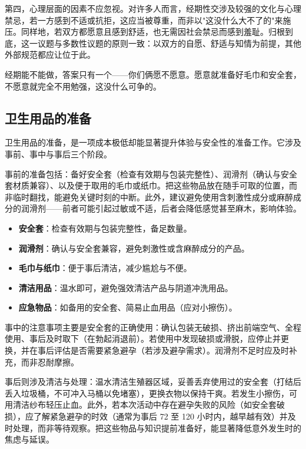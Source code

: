 \documentclass[12pt,UTF8]{ctexbook}
\newcommand{\keyword}[1]{\textbf{#1}}
\begin{document}
第四，心理层面的因素不应忽视。对许多人而言，经期性交涉及较强的文化与心理禁忌，若一方感到不适或抗拒，这应当被尊重，而非以"这没什么大不了的"来施压。同样地，若双方都愿意且感到舒适，也无需因社会禁忌而感到羞耻。归根到底，这一议题与多数性议题的原则一致：以双方的自愿、舒适与知情为前提，其他外部规范都应让位于此。

\begin{tcolorbox}[colback=pink!5!white,colframe=red!50!black,title=贴心小叮咛]
经期能不能做，答案只有一个——你们俩愿不愿意。愿意就准备好毛巾和安全套，不愿意就完全不用勉强，这没什么可争的。
\end{tcolorbox}
\subsection{卫生用品的准备}

卫生用品的准备，是一项成本极低却能显著提升体验与安全性的准备工作。它涉及事前、事中与事后三个阶段。

事前的准备包括：备好安全套（检查有效期与包装完整性）、润滑剂（确认与安全套材质兼容）、以及便于取用的毛巾或纸巾。把这些物品放在随手可取的位置，而非临时翻找，能避免关键时刻的中断。此外，建议避免使用含刺激性成分或麻醉成分的润滑剂——前者可能引起过敏或不适，后者会降低感觉甚至麻木，影响体验。

\begin{itemize}
  \item \keyword{安全套}：检查有效期与包装完整性，备足数量。
  \item \keyword{润滑剂}：确认与安全套兼容，避免刺激性或含麻醉成分的产品。
  \item \keyword{毛巾与纸巾}：便于事后清洁，减少尴尬与不便。
  \item \keyword{清洁用品}：温水即可，避免强效清洁产品与阴道冲洗用品。
  \item \keyword{应急物品}：如备用的安全套、简易止血用品（应对小擦伤）。
\end{itemize}

事中的注意事项主要是安全套的正确使用：确认包装无破损、挤出前端空气、全程使用、事后及时取下（在勃起消退前）。若使用中发现破损或滑脱，应停止并更换，并在事后评估是否需要紧急避孕（若涉及避孕需求）。润滑剂不足时应及时补充，而非忍耐摩擦。

事后则涉及清洁与处理：温水清洁生殖器区域，妥善丢弃使用过的安全套（打结后丢入垃圾桶，不可冲入马桶以免堵塞），更换衣物以保持干爽。若发生小擦伤，可用清洁纱布轻压止血。此外，若本次活动中存在避孕失败的风险（如安全套破损），应了解紧急避孕的时效（通常为事后 72 至 120 小时内，越早越有效）并及时处理，而非等待观察。把这些物品与知识提前准备好，能显著降低意外发生时的焦虑与延误。
\end{document}
